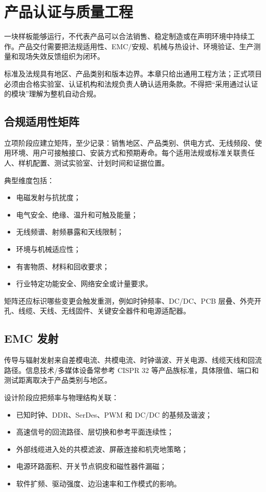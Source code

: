 \chapter{产品认证与质量工程}
\label{chap:product-qualification-quality}

一块样板能够运行，不代表产品可以合法销售、稳定制造或在声明环境中持续工作。产品交付需要把法规适用性、EMC/安规、机械与热设计、环境验证、生产测量和现场失效反馈组织为闭环。

标准及法规具有地区、产品类别和版本边界。本章只给出通用工程方法；正式项目必须由合格实验室、认证机构和法规负责人确认适用条款。不得把“采用通过认证的模块”理解为整机自动合规。

\section{合规适用性矩阵}

立项阶段应建立矩阵，至少记录：销售地区、产品类别、供电方式、无线频段、使用环境、用户可接触接口、安装方式和预期寿命。每个适用法规或标准关联责任人、样机配置、测试实验室、计划时间和证据位置。

典型维度包括：
\begin{itemize}
  \item 电磁发射与抗扰度；
  \item 电气安全、绝缘、温升和可触及能量；
  \item 无线频谱、射频暴露和天线限制；
  \item 环境与机械适应性；
  \item 有害物质、材料和回收要求；
  \item 行业特定功能安全、网络安全或计量要求。
\end{itemize}

矩阵还应标识哪些变更会触发重测，例如时钟频率、DC/DC、PCB 层叠、外壳开孔、线缆、天线、无线固件、关键安全器件和电源适配器。

\section{EMC 发射}

传导与辐射发射来自差模电流、共模电流、时钟谐波、开关电源、线缆天线和回流路径。信息技术/多媒体设备常参考 CISPR 32 等产品族标准，具体限值、端口和测试距离取决于产品类别与地区\cite{cispr32,fcc-part15}。

设计阶段应把频率与物理结构关联：
\begin{itemize}
  \item 已知时钟、DDR、SerDes、PWM 和 DC/DC 的基频及谐波；
  \item 高速信号的回流路径、层切换和参考平面连续性；
  \item 外部线缆进入处的共模滤波、屏蔽连接和机壳地策略；
  \item 电源环路面积、开关节点铜皮和磁性器件漏磁；
  \item 软件扩频、驱动强度、边沿速率和工作模式的影响。
\end{itemize}

